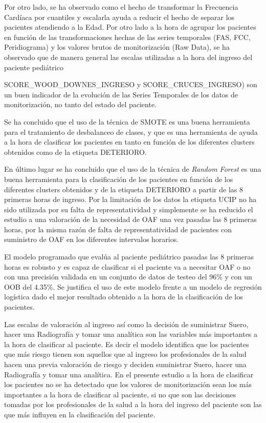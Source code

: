 Por otro lado, se ha observado como el hecho de transformar la Frecuencia Cardíaca por cuantiles y escalarla ayuda a reducir el hecho de separar los pacientes atendiendo a la Edad. Por otro lado a la hora de agrupar los pacientes en función de las transformaciones hechas de las series temporales (FAS, FCC, Peridiograma) y los valores brutos de monitorización (Raw Data), se ha observado que de manera general las escalas utilizadas a la hora del ingreso del paciente pediátrico {SCORE\_WOOD\_DOWNES\_INGRESO y SCORE\_CRUCES\_INGRESO) son un buen indicador de la evolución de las Series Temporales de los datos de monitorización, no tanto del estado del paciente. 

Se ha concluido que el uso de la técnica de SMOTE es una buena herramienta para el tratamiento de desbalanceo de clases, y que es una herramienta de ayuda a la hora de clasificar los pacientes en tanto en función de los diferentes clusters obtenidos como de la etiqueta DETERIORO.

En último lugar se ha concluido que el uso de la técnica de \textit{Random Forest} es una buena herramienta para la clasificación de los pacientes en función de los diferentes clusters obtenidos y de la etiqueta DETERIORO a partir de las 8 primeras horas de ingreso. Por la limitación de los datos la etiqueta UCIP no ha sido utilizada por su falta de representatividad y simplemente se ha reducido el estudio a una valoración de la necesidad de OAF una vez pasadas las 8 primeras horas, por la misma razón de falta de representatividad de pacientes con suministro de OAF en los diferentes intervalos horarios.

El modelo programado que evalúa al paciente pediátrico pasadas las 8 primeras horas es robusto y es capaz de clasificar si el paciente va a necesitar OAF o no con una precisión validada en un conjunto de datos de testeo del 96\% y con un OOB del 4.35\%. Se justifica el uso de este modelo frente a un modelo de regresión logística dado el mejor resultado obtenido a la hora de la clasificación de los pacientes.

Las escalas de valoración al ingreso así como la decisión de suministrar Suero, hacer una Radiografía y tomar una analítica son las variables más importantes a la hora de clasificar al paciente. Es decir el modelo identifica que los pacientes que más riesgo tienen son aquellos que al ingreso los profesionales de la salud hacen una previa valoración de riesgo y deciden suministrar Suero, hacer una Radiografía y tomar una analítica. En el presente estudio a la hora de clasificar los pacientes no se ha detectado que los valores de monitorización sean los más importantes a la hora de clasificar al paciente, si no que son las decisiones tomadas por los profesionales de la salud a la hora del ingreso del paciente son las que más influyen en la clasificación del paciente.

}
